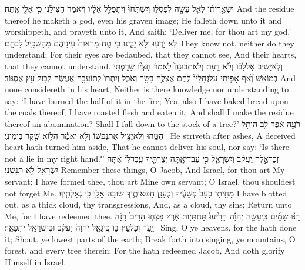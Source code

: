 {וּשְׁאֵ֣רִית֔וֹ לְאֵ֥ל עָשָׂ֖ה לְפִסְל֑וֹ  וְיִשְׁתַּ֙חוּ֙ וְיִתְפַּלֵּ֣ל אֵלָ֔יו וְיֹאמַר֙ הַצִּילֵ֔נִי כִּ֥י אֵלִ֖י אָֽתָּה׃}
{And the residue thereof he maketh a god, even his graven image; He falleth down unto it and worshippeth, and prayeth unto it, And saith: ‘Deliver me, for thou art my god.’}
{לֹ֥א יָדְע֖וּ וְלֹ֣א יָבִ֑ינוּ כִּ֣י טַ֤ח מֵֽרְאוֹת֙ עֵינֵיהֶ֔ם מֵהַשְׂכִּ֖יל לִבֹּתָֽם׃}
{They know not, neither do they understand; For their eyes are bedaubed, that they cannot see, And their hearts, that they cannot understand.}
{וְלֹֽא\maqqaf יָשִׁ֣יב אֶל\maqqaf לִבּ֗וֹ וְלֹ֨א דַ֥עַת וְלֹא\maqqaf תְבוּנָה֮ לֵאמֹר֒ חֶצְי֞וֹ שָׂרַ֣פְתִּי בְמוֹ\maqqaf אֵ֗שׁ וְ֠אַ֠ף אָפִ֤יתִי עַל\maqqaf גֶּחָלָיו֙ לֶ֔חֶם אֶצְלֶ֥ה בָשָׂ֖ר וְאֹכֵ֑ל וְיִתְרוֹ֙ לְתוֹעֵבָ֣ה אֶעֱשֶׂ֔ה לְב֥וּל עֵ֖ץ אֶסְגּֽוֹד׃}
{And none considereth in his heart, Neither is there knowledge nor understanding to say: ‘I have burned the half of it in the fire; Yea, also I have baked bread upon the coals thereof; I have roasted flesh and eaten it; And shall I make the residue thereof an abomination? Shall I fall down to the stock of a tree?’}
{רֹעֶ֣ה אֵ֔פֶר לֵ֥ב הוּתַ֖ל הִטָּ֑הוּ וְלֹא\maqqaf יַצִּ֤יל אֶת\maqqaf נַפְשׁוֹ֙ וְלֹ֣א יֹאמַ֔ר הֲל֥וֹא שֶׁ֖קֶר בִּימִינִֽי׃ \setuma }
{He striveth after ashes, A deceived heart hath turned him aside, That he cannot deliver his soul, nor say: ‘Is there not a lie in my right hand?’}
{זְכׇר\maqqaf אֵ֣לֶּה יַֽעֲקֹ֔ב וְיִשְׂרָאֵ֖ל כִּ֣י עַבְדִּי\maqqaf אָ֑תָּה יְצַרְתִּ֤יךָ עֶֽבֶד\maqqaf לִי֙ אַ֔תָּה יִשְׂרָאֵ֖ל לֹ֥א תִנָּשֵֽׁנִי׃}
{Remember these things, O Jacob, And Israel, for thou art My servant; I have formed thee, thou art Mine own servant; O Israel, thou shouldest not forget Me.}
{מָחִ֤יתִי כָעָב֙ פְּשָׁעֶ֔יךָ וְכֶעָנָ֖ן חַטֹּאותֶ֑יךָ שׁוּבָ֥ה אֵלַ֖י כִּ֥י גְאַלְתִּֽיךָ׃}
{I have blotted out, as a thick cloud, thy transgressions, And, as a cloud, thy sins; Return unto Me, for I have redeemed thee.}
{רׇנּ֨וּ שָׁמַ֜יִם כִּֽי\maqqaf עָשָׂ֣ה יְהֹוָ֗ה הָרִ֙יעוּ֙ תַּחְתִּיּ֣וֹת אָ֔רֶץ פִּצְח֤וּ הָרִים֙ רִנָּ֔ה יַ֖עַר וְכׇל\maqqaf עֵ֣ץ בּ֑וֹ כִּֽי\maqqaf גָאַ֤ל יְהֹוָה֙ יַעֲקֹ֔ב וּבְיִשְׂרָאֵ֖ל יִתְפָּאָֽר׃ \setuma }
{Sing, O ye heavens, for the \lord\space hath done it; Shout, ye lowest parts of the earth; Break forth into singing, ye mountains, O forest, and every tree therein; For the \lord\space hath redeemed Jacob, And doth glorify Himself in Israel.}
\newperek
{}
\label{haft_25}
